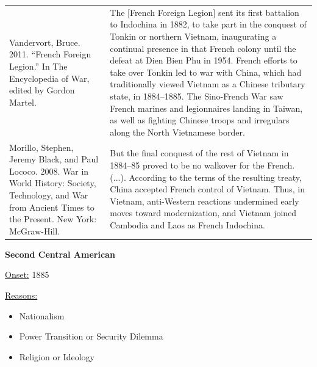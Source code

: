 {\begin{longtable}{p{}p{}}
\\
Vandervort, Bruce. 2011. “French Foreign Legion.” In The Encyclopedia of War, edited by Gordon Martel. & The [French Foreign Legion] sent its first battalion to Indochina in 1882, to take part in the conquest of Tonkin or northern Vietnam, inaugurating a continual presence in that French colony until the defeat at Dien Bien Phu in 1954. French efforts to take over Tonkin led to war with China, which had traditionally viewed Vietnam as a Chinese tributary state, in 1884–1885. The Sino-French War saw French marines and legionnaires landing in Taiwan, as well as fighting Chinese troops and irregulars along the North Vietnamese border.
\\
Morillo, Stephen, Jeremy Black, and Paul Lococo. 2008. War in World History: Society, Technology, and War from Ancient Times to the Present. New York: McGraw-Hill. & But the final conquest of the rest of Vietnam in 1884–85 proved to be no walkover for the French. (...).  According to the terms of the resulting treaty, China accepted French control of Vietnam. Thus, in Vietnam, anti-Western reactions undermined early moves toward modernization, and Vietnam joined Cambodia and Laos as French Indochina.
\\
\end{longtable}}
\clearpage
         \textbf{Second Central American} 

          \underline{Onset:} 1885         

\underline{Reasons:}
\begin{itemize}
\item Nationalism
\item Power Transition or Security Dilemma
\item Religion or Ideology
\end{itemize}

